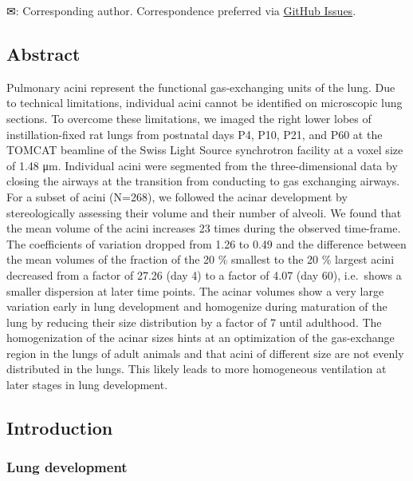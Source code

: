 \documentclass[
  american,
]{article}
\begin{document}
✉: Corresponding author. Correspondence preferred via \href{https://github.com/habi/acinar-analysis-manuscript/issues}{GitHub Issues}.

\hypertarget{abstract}{%
\subsection{Abstract}\label{abstract}}

Pulmonary acini represent the functional gas-exchanging units of the lung.
Due to technical limitations, individual acini cannot be identified on microscopic lung sections.
To overcome these limitations, we imaged the right lower lobes of instillation-fixed rat lungs from postnatal days P4, P10, P21, and P60 at the TOMCAT beamline of the Swiss Light Source synchrotron facility at a voxel size of 1.48 μm.
Individual acini were segmented from the three-dimensional data by closing the airways at the transition from conducting to gas exchanging airways.
For a subset of acini (N=268), we followed the acinar development by stereologically assessing their volume and their number of alveoli.
We found that the mean volume of the acini increases 23 times during the observed time-frame.
The coefficients of variation dropped from 1.26 to 0.49 and the difference between the mean volumes of the fraction of the 20 \% smallest to the 20 \% largest acini decreased from a factor of 27.26 (day 4) to a factor of 4.07 (day 60), i.e.~shows a smaller dispersion at later time points.
The acinar volumes show a very large variation early in lung development and homogenize during maturation of the lung by reducing their size distribution by a factor of 7 until adulthood.
The homogenization of the acinar sizes hints at an optimization of the gas-exchange region in the lungs of adult animals and that acini of different size are not evenly distributed in the lungs.
This likely leads to more homogeneous ventilation at later stages in lung development.

\hypertarget{introduction}{%
\subsection{Introduction}\label{introduction}}

\hypertarget{lung-development}{%
\subsubsection{Lung development}\label{lung-development}}
\end{document}
